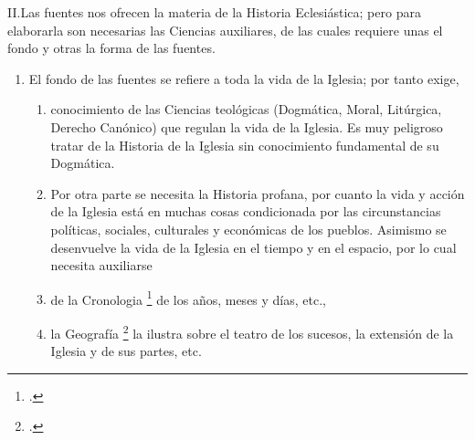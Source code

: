 \raggedbottom{} \documentclass[12pt, a4paper]{book}
\begin{document}
II.\@ Las fuentes nos ofrecen la materia de la Historia Eclesiástica; pero para elaborarla son necesarias las Ciencias auxiliares, de las cuales requiere unas el fondo y otras la forma de las fuentes.
\begin{enumerate}
  \item El fondo de las fuentes se refiere a toda la vida de la Iglesia;
        por tanto exige,\begin{enumerate}
          \item conocimiento de las Ciencias teológicas (Dogmática, Moral, Litúrgica, Derecho Canónico) que regulan la vida de la Iglesia. Es muy peligroso tratar de la Historia de la Iglesia sin conocimiento fundamental de su Dogmática.
          \item Por otra parte se necesita la Historia profana, por cuanto la vida y acción de la Iglesia está en muchas cosas condicionada por las circunstancias políticas, sociales, culturales y económicas de los pueblos. Asimismo se desenvuelve la vida de la Iglesia en el tiempo y en el espacio, por lo cual necesita auxiliarse
          \item de la Cronologia \footcite{Petavius1703DeDoctrina} de los años, meses y días, etc.,
          \item la Geografía \footcite{Chevalier1894Topo} la ilustra sobre el teatro de los sucesos, la extensión de la Iglesia y de sus partes, etc.



\end{enumerate}
\end{enumerate}
\end{document}
